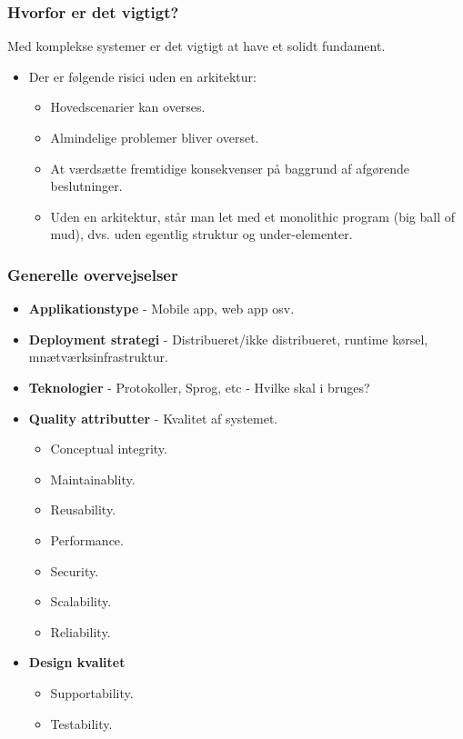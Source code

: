 \subsubsection{Hvorfor er det vigtigt?}
Med komplekse systemer er det vigtigt at have et solidt fundament.

\begin{itemize}
	\item Der er følgende risici uden en arkitektur:
	\begin{itemize}
		\item Hovedscenarier kan overses.
		\item Almindelige problemer bliver overset.
		\item At værdsætte fremtidige konsekvenser på baggrund af afgørende beslutninger.
		\item Uden en arkitektur, står man let med et monolithic program (big ball of mud), dvs. uden egentlig struktur og under-elementer.
	\end{itemize}
\end{itemize}

\subsubsection{Generelle overvejselser}
\begin{itemize}
	\item \textbf{Applikationstype} - Mobile app, web app osv.
	\item \textbf{Deployment strategi} - Distribueret/ikke distribueret, runtime kørsel, mnætværksinfrastruktur.
	\item \textbf{Teknologier} - Protokoller, Sprog, etc - Hvilke skal i bruges?
	\item \textbf{Quality attributter} - Kvalitet af systemet.
	\begin{itemize}
		\item Conceptual integrity.
		\item Maintainablity.
		\item Reusability.
		\item Performance.
		\item Security.
		\item Scalability.
		\item Reliability.
	\end{itemize}
	\item \textbf{Design kvalitet}
	\begin{itemize}
		\item Supportability.
		\item Testability.
	\end{itemize}
\end{itemize}

